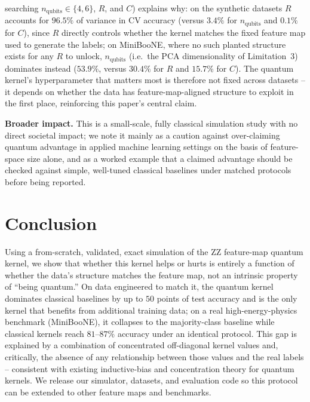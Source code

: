 \documentclass{article}
\begin{document}
searching $n_\text{qubits} \in \{4,6\}$, $R$, and $C$) explains why: on the
synthetic datasets $R$ accounts for $96.5\%$ of variance in CV accuracy
(versus $3.4\%$ for $n_\text{qubits}$ and $0.1\%$ for $C$), since $R$
directly controls whether the kernel matches the fixed feature map used to
generate the labels; on MiniBooNE, where no such planted structure exists
for any $R$ to unlock, $n_\text{qubits}$ (i.e.\ the PCA dimensionality of
Limitation~3) dominates instead ($53.9\%$, versus $30.4\%$ for $R$ and
$15.7\%$ for $C$). The quantum kernel's hyperparameter that matters most is
therefore not fixed across datasets -- it depends on whether the data has
feature-map-aligned structure to exploit in the first place, reinforcing
this paper's central claim.

\textbf{Broader impact.} This is a small-scale, fully classical simulation
study with no direct societal impact; we note it mainly as a caution
against over-claiming quantum advantage in applied machine learning
settings on the basis of feature-space size alone, and as a worked example
that a claimed advantage should be checked against simple, well-tuned
classical baselines under matched protocols before being reported.

\section{Conclusion}

Using a from-scratch, validated, exact simulation of the ZZ feature-map
quantum kernel, we show that whether this kernel helps or hurts is entirely
a function of whether the data's structure matches the feature map, not an
intrinsic property of ``being quantum.'' On data engineered to match it, the
quantum kernel dominates classical baselines by up to $50$ points of test
accuracy and is the only kernel that benefits from additional training
data; on a real high-energy-physics benchmark (MiniBooNE), it collapses to
the majority-class baseline while classical kernels reach $81$--$87\%$
accuracy under an identical protocol. This gap is explained by a
combination of concentrated
off-diagonal kernel values and, critically, the absence of any relationship
between those values and the real labels -- consistent with existing
inductive-bias and concentration theory for quantum kernels. We release our
simulator, datasets, and evaluation code so this protocol can be extended to
other feature maps and benchmarks.



\end{document}

